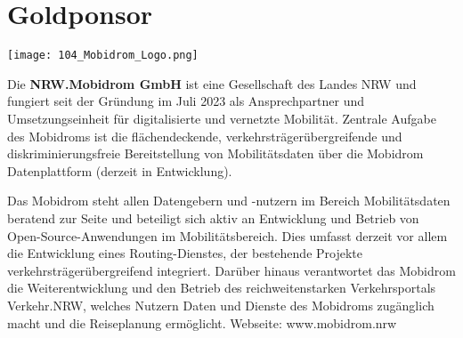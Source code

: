 \section*{Goldponsor}
\begin{flushright}
\texttt{[image: 104\_Mobidrom\_Logo.png]}
\end{flushright}
\noindent
Die {\bfseries NRW.Mobidrom GmbH} ist eine Gesellschaft des Landes NRW und fungiert seit der Gründung im Juli 2023 als Ansprechpartner und Umsetzungseinheit für digitalisierte und vernetzte Mobilität. Zentrale Aufgabe des Mobidroms ist die flächendeckende, verkehrsträgerübergreifende und diskriminierungsfreie Bereitstellung von Mobilitätsdaten über die Mobidrom Datenplattform (derzeit in Entwicklung).

\noindent
Das Mobidrom steht allen Datengebern und -nutzern im Bereich Mobilitätsdaten beratend zur Seite und beteiligt sich aktiv an Entwicklung und Betrieb von Open-Source-Anwendungen im Mobilitätsbereich. Dies umfasst derzeit vor allem die Entwicklung eines Routing-Dienstes, der bestehende Projekte verkehrsträgerübergreifend integriert. Darüber hinaus verantwortet das Mobidrom die Weiterentwicklung und den Betrieb des reichweitenstarken Verkehrsportals Verkehr.NRW, welches Nutzern Daten und Dienste des Mobidroms zugänglich macht und die Reiseplanung ermöglicht. Webseite: www.mobidrom.nrw


